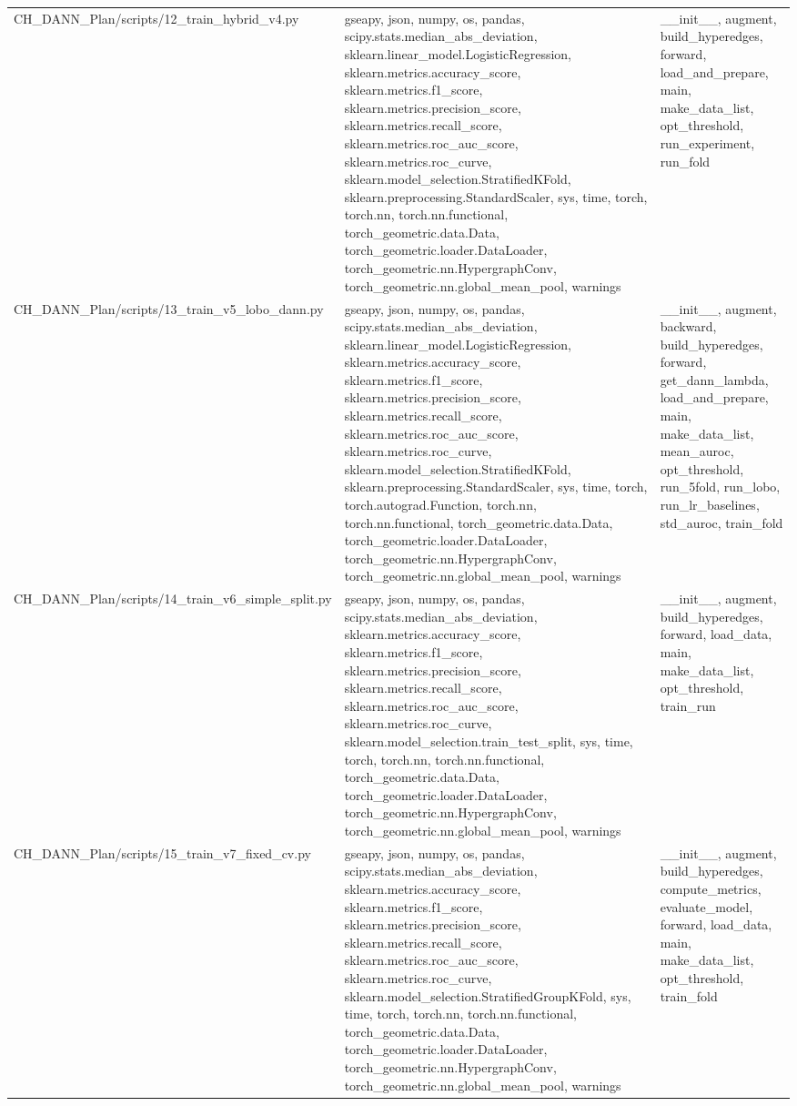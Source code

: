 \documentclass[11pt]{article}
\begin{document}
\begin{longtable}{p{}p{}p{}}
CH\_DANN\_Plan/scripts/12\_train\_hybrid\_v4.py & gseapy, json, numpy, os, pandas, scipy.stats.median\_abs\_deviation, sklearn.linear\_model.LogisticRegression, sklearn.metrics.accuracy\_score, sklearn.metrics.f1\_score, sklearn.metrics.precision\_score, sklearn.metrics.recall\_score, sklearn.metrics.roc\_auc\_score, sklearn.metrics.roc\_curve, sklearn.model\_selection.StratifiedKFold, sklearn.preprocessing.StandardScaler, sys, time, torch, torch.nn, torch.nn.functional, torch\_geometric.data.Data, torch\_geometric.loader.DataLoader, torch\_geometric.nn.HypergraphConv, torch\_geometric.nn.global\_mean\_pool, warnings & \_\_init\_\_, augment, build\_hyperedges, forward, load\_and\_prepare, main, make\_data\_list, opt\_threshold, run\_experiment, run\_fold \\
CH\_DANN\_Plan/scripts/13\_train\_v5\_lobo\_dann.py & gseapy, json, numpy, os, pandas, scipy.stats.median\_abs\_deviation, sklearn.linear\_model.LogisticRegression, sklearn.metrics.accuracy\_score, sklearn.metrics.f1\_score, sklearn.metrics.precision\_score, sklearn.metrics.recall\_score, sklearn.metrics.roc\_auc\_score, sklearn.metrics.roc\_curve, sklearn.model\_selection.StratifiedKFold, sklearn.preprocessing.StandardScaler, sys, time, torch, torch.autograd.Function, torch.nn, torch.nn.functional, torch\_geometric.data.Data, torch\_geometric.loader.DataLoader, torch\_geometric.nn.HypergraphConv, torch\_geometric.nn.global\_mean\_pool, warnings & \_\_init\_\_, augment, backward, build\_hyperedges, forward, get\_dann\_lambda, load\_and\_prepare, main, make\_data\_list, mean\_auroc, opt\_threshold, run\_5fold, run\_lobo, run\_lr\_baselines, std\_auroc, train\_fold \\
CH\_DANN\_Plan/scripts/14\_train\_v6\_simple\_split.py & gseapy, json, numpy, os, pandas, scipy.stats.median\_abs\_deviation, sklearn.metrics.accuracy\_score, sklearn.metrics.f1\_score, sklearn.metrics.precision\_score, sklearn.metrics.recall\_score, sklearn.metrics.roc\_auc\_score, sklearn.metrics.roc\_curve, sklearn.model\_selection.train\_test\_split, sys, time, torch, torch.nn, torch.nn.functional, torch\_geometric.data.Data, torch\_geometric.loader.DataLoader, torch\_geometric.nn.HypergraphConv, torch\_geometric.nn.global\_mean\_pool, warnings & \_\_init\_\_, augment, build\_hyperedges, forward, load\_data, main, make\_data\_list, opt\_threshold, train\_run \\
CH\_DANN\_Plan/scripts/15\_train\_v7\_fixed\_cv.py & gseapy, json, numpy, os, pandas, scipy.stats.median\_abs\_deviation, sklearn.metrics.accuracy\_score, sklearn.metrics.f1\_score, sklearn.metrics.precision\_score, sklearn.metrics.recall\_score, sklearn.metrics.roc\_auc\_score, sklearn.metrics.roc\_curve, sklearn.model\_selection.StratifiedGroupKFold, sys, time, torch, torch.nn, torch.nn.functional, torch\_geometric.data.Data, torch\_geometric.loader.DataLoader, torch\_geometric.nn.HypergraphConv, torch\_geometric.nn.global\_mean\_pool, warnings & \_\_init\_\_, augment, build\_hyperedges, compute\_metrics, evaluate\_model, forward, load\_data, main, make\_data\_list, opt\_threshold, train\_fold \\

\end{longtable}
\end{document}
